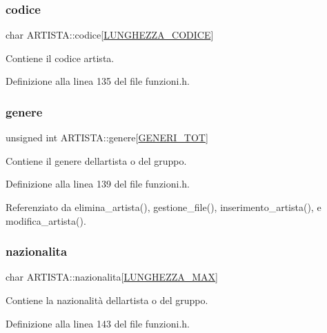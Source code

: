 \subsubsection{\texorpdfstring{codice}{codice}}
{\footnotesize\ttfamily char A\+R\+T\+I\+S\+T\+A\+::codice\mbox{[}\hyperlink{funzioni_8h_a15beac41f998f4495a79396160235665}{L\+U\+N\+G\+H\+E\+Z\+Z\+A\+\_\+\+C\+O\+D\+I\+CE}\mbox{]}}

Contiene il codice artista. 

Definizione alla linea 135 del file funzioni.\+h.

\mbox{\label{struct_a_r_t_i_s_t_a_a27c2d0af7e1f8ac38c84bcfc71f87f4b}} 
\subsubsection{\texorpdfstring{genere}{genere}}
{\footnotesize\ttfamily unsigned int A\+R\+T\+I\+S\+T\+A\+::genere\mbox{[}\hyperlink{funzioni_8h_aadfbb01ff59a52b086b4c96f1a5e0cd2}{G\+E\+N\+E\+R\+I\+\_\+\+T\+OT}\mbox{]}}

Contiene il genere dell\textquotesingle{}artista o del gruppo. 

Definizione alla linea 139 del file funzioni.\+h.



Referenziato da elimina\+\_\+artista(), gestione\+\_\+file(), inserimento\+\_\+artista(), e modifica\+\_\+artista().

\mbox{\label{struct_a_r_t_i_s_t_a_a9b2d858c8f1c17c58a15ad20eb10118e}} 
\subsubsection{\texorpdfstring{nazionalita}{nazionalita}}
{\footnotesize\ttfamily char A\+R\+T\+I\+S\+T\+A\+::nazionalita\mbox{[}\hyperlink{funzioni_8h_a2cdd71b92d6e869f8b094e32a6da6a62}{L\+U\+N\+G\+H\+E\+Z\+Z\+A\+\_\+\+M\+AX}\mbox{]}}

Contiene la nazionalità dell\textquotesingle{}artista o del gruppo. 

Definizione alla linea 143 del file funzioni.\+h.

\mbox{\label{struct_a_r_t_i_s_t_a_a8ddd53b0e7cbe5f893e13b26a0203005}} 
